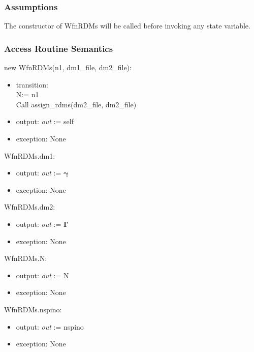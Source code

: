 \documentclass[12pt, titlepage]{article}
\begin{document}
\subsubsection{Assumptions}

The constructor of WfnRDMs will be called before invoking any state variable.

\subsubsection{Access Routine Semantics}

\noindent new WfnRDMs(n1, dm1\_file, dm2\_file):
\begin{itemize}
	\item transition: \\
	N:= n1\\
	Call assign\_rdms(dm2\_file, dm2\_file)
	\item output: \textit{out} := self 
	\item exception: None 
\end{itemize}

\noindent WfnRDMs.dm1:
\begin{itemize}
	\item output: \textit{out} := $\boldsymbol{\gamma}$ 
	\item exception: None 
\end{itemize}

\noindent WfnRDMs.dm2:
\begin{itemize}
	\item output: \textit{out} := $\boldsymbol{\Gamma}$ 
	\item exception: None 
\end{itemize}

\noindent WfnRDMs.N:
\begin{itemize}
	\item output: \textit{out} := N 
	\item exception: None 
\end{itemize}

\noindent WfnRDMs.nspino:
\begin{itemize}
	\item output: \textit{out} := nspino
	\item exception: None 
\end{itemize}
\end{document}
